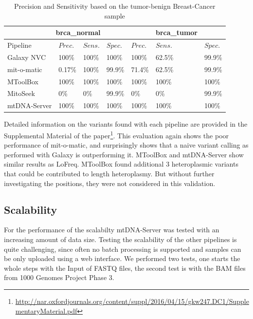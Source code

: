 \begin{table}[h]
\centering
\caption{Precision and Sensitivity based on the tumor-benign Breast-Cancer sample}
\label{table:brca}
\begin{tabular}{l|lll|lll}
\multicolumn{5}{c}{brca\_normal} &   {brca\_tumor}  \\
\hline
Pipeline &  $Prec.$ & $Sens.$ & $Spec.$  &  $Prec.$ & $Sens.$ & $Spec.$ \\
\hline
Galaxy NVC &    100\% &  100\% &  100\%  &   100\% &  62.5\% &  99.9\% \\
mit-o-matic &   0.17\% &  100\% &  99.9\%  &   71.4\% & 62.5\% & 99.9\% \\
MToolBox &      100\% &  100\% &  100\%  &   100\% & 100\% & 100\%\\
MitoSeek&       0\% &  0\% &  99.9\%  &   0\% & 0\% & 99.9\%\\
mtDNA-Server &  100\% &  100\% &  100\%  &   100\% &   100\% &   100\% \\
\end{tabular}
\end{table}
Detailed information on the variants found with each pipeline are provided in the Supplemental Material of the paper\footnote{\url{http://nar.oxfordjournals.org/content/suppl/2016/04/15/gkw247.DC1/SupplementaryMaterial.pdf}}. This evaluation again shows the poor performance of mit-o-matic, and surprisingly shows that a naive variant calling as performed with Galaxy is outperforming it. MToolBox and mtDNA-Server show similar results as LoFreq. MToolBox found additional 3 heteroplasmic variants that could be contributed to length heteroplasmy. But without further investigating the positions, they were not considered in this validation. 
\subsection{Scalability}
For the performance of the scalabilty mtDNA-Server was tested with an increasing amount of data size. Testing the scalability of the other pipelines is quite challenging, since often no batch processing is supported and samples can be only uploaded using a web interface. We performed two tests, one starts the whole steps with the Input of FASTQ files, the second test is with the BAM files from 1000 Genomes Project Phase 3. 

